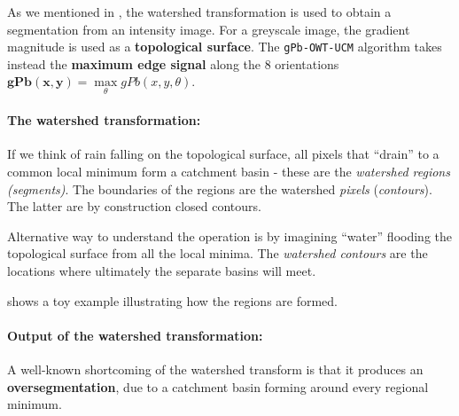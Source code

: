 As we mentioned in , the watershed transformation is used to obtain a segmentation from an intensity image. 
For a greyscale image, the gradient magnitude is used as a {\bf topological surface}. The {\tt gPb-OWT-UCM} algorithm takes instead the {\bf maximum edge signal} along the 8 orientations $\mathbf{gPb(x,y)}=\max\limits_{\theta}gPb(x,y,\theta)$. 

\paragraph{The watershed transformation:} If we think of rain falling on the %
topological surface, all pixels that ``drain'' to a common local minimum form a catchment basin - these are the {\it watershed regions (segments)}. The boundaries of the regions are the watershed \textit{pixels} (\textit{contours}). 
The latter are by construction closed contours. 

Alternative way to understand the operation is by imagining ``water'' flooding the topological surface from all the local minima. The {\it watershed contours} are the locations where ultimately the separate basins will meet.

 shows a toy example illustrating how the regions are formed.

\paragraph{Output of the watershed transformation:} A well-known shortcoming of the watershed transform is that 
it produces an {\bf oversegmentation}, 
due to a catchment basin forming around every regional minimum.



